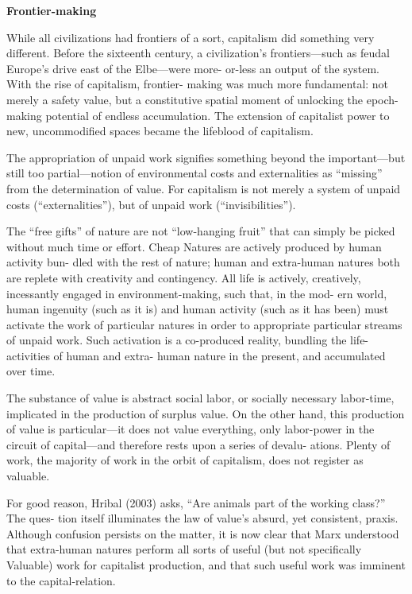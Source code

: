 \documentclass[
]{book}
\begin{document}
\textbf{Frontier-making}

While all civilizations had frontiers of a sort, capitalism did
something very different. Before the sixteenth century, a civilization's
frontiers---such as feudal Europe's drive east of the Elbe---were more-
or-less an output of the system. With the rise of capitalism, frontier-
making was much more fundamental: not merely a safety value, but
a constitutive spatial moment of unlocking the epoch-making potential
of endless accumulation. The extension of capitalist power to
new, uncommodified spaces became the lifeblood of capitalism.

The appropriation of unpaid work signifies something beyond
the important---but still too partial---notion of environmental costs
and externalities as ``missing'' from the determination of value.
For capitalism is not merely a system of unpaid costs
(``externalities''), but of unpaid work (``invisibilities'').

The ``free gifts'' of nature are
not ``low-hanging fruit'' that can simply be picked without much time
or effort. Cheap Natures are actively produced by human activity bun-
dled with the rest of nature; human and extra-human natures both are
replete with creativity and contingency. All life is actively, creatively,
incessantly engaged in environment-making, such that, in the mod-
ern world, human ingenuity (such as it is) and human activity (such
as it has been) must activate the work of particular natures in order
to appropriate particular streams of unpaid work. Such activation is
a co-produced reality, bundling the life-activities of human and extra-
human nature in the present, and accumulated over time.

The substance of value is
abstract social labor, or socially necessary labor-time, implicated in
the production of surplus value. On the other hand, this production
of value is particular---it does not value everything, only labor-power
in the circuit of capital---and therefore rests upon a series of devalu-
ations. Plenty of work, the majority of work in the orbit of capitalism,
does not register as valuable.

For good reason,
Hribal (2003) asks, ``Are animals part of the working class?'' The ques-
tion itself illuminates the law of value's absurd, yet consistent, praxis.
Although confusion persists on the matter, it is now clear that Marx
understood that extra-human natures perform all sorts of useful (but
not specifically Valuable) work for capitalist production, and that such
useful work was imminent to the capital-relation.
\end{document}
